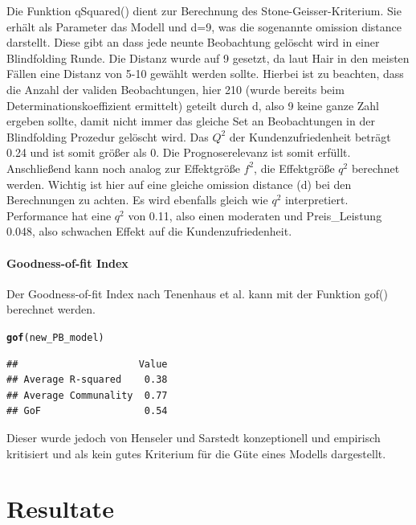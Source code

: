 \documentclass{article}\usepackage[]{graphicx}\usepackage[]{color}
\makeatletter
\newcommand{\hlstd}[1]{\textcolor[rgb]{0.345,0.345,0.345}{#1}}%
\newcommand{\hlkwd}[1]{\textcolor[rgb]{0.737,0.353,0.396}{\textbf{#1}}}%
\newenvironment{kframe}{%
 \def\at@end@of@kframe{}%
 \ifinner\ifhmode%
  \def\at@end@of@kframe{\end{minipage}}%
  \begin{minipage}{\columnwidth}%
 \fi\fi%
 \def\FrameCommand##1{\hskip\@totalleftmargin \hskip-\fboxsep
 \colorbox{shadecolor}{##1}\hskip-\fboxsep
     \hskip-\linewidth \hskip-\@totalleftmargin \hskip\columnwidth}%
 \MakeFramed {\advance\hsize-\width
   \@totalleftmargin\z@ \linewidth\hsize
   \@setminipage}}%
 {\par\unskip\endMakeFramed%
 \at@end@of@kframe}
\newenvironment{knitrout}{}{} %
\makeatother
\begin{document}
Die Funktion qSquared() dient zur Berechnung des Stone-Geisser-Kriterium. Sie erhält als Parameter das Modell und d=9, was die sogenannte omission distance darstellt. Diese gibt an dass jede neunte Beobachtung gelöscht wird in einer Blindfolding Runde. Die Distanz wurde auf 9 gesetzt, da laut Hair\cite{hair2012assessment} in den meisten Fällen eine Distanz von 5-10 gewählt werden sollte. Hierbei ist zu beachten, dass die Anzahl der validen Beobachtungen, hier 210 (wurde bereits beim Determinationskoeffizient ermittelt) geteilt durch d, also 9 keine ganze Zahl ergeben sollte, damit nicht immer das gleiche Set an Beobachtungen in der Blindfolding Prozedur gelöscht wird. Das $Q^{2}$ der Kundenzufriedenheit beträgt 0.24 und ist somit größer als 0. Die Prognoserelevanz ist somit erfüllt. Anschließend kann noch analog zur Effektgröße $f^{2}$, die Effektgröße $q^{2}$ berechnet werden. Wichtig ist hier auf eine gleiche omission distance (d) bei den Berechnungen zu achten. Es wird ebenfalls gleich wie $q^{2}$ interpretiert. Performance hat eine $q^{2}$ von 0.11, also einen moderaten und Preis\_Leistung 0.048, also schwachen Effekt auf die Kundenzufriedenheit.

\paragraph{Goodness-of-fit Index}
Der Goodness-of-fit Index nach Tenenhaus et al.\cite{tenenhaus2004global} kann mit der Funktion gof() berechnet werden.
\begin{knitrout}
\color{fgcolor}\begin{kframe}
\begin{alltt}
\hlkwd{gof}\hlstd{(new_PB_model)}
\end{alltt}
\begin{verbatim}
##                     Value
## Average R-squared    0.38
## Average Communality  0.77
## GoF                  0.54
\end{verbatim}
\end{kframe}
\end{knitrout}
Dieser wurde jedoch von Henseler und Sarstedt konzeptionell und empirisch kritisiert und als kein gutes Kriterium für die Güte eines Modells dargestellt.\cite{henseler2013goodness} 

\newpage
\section{Resultate}%
\end{document}
